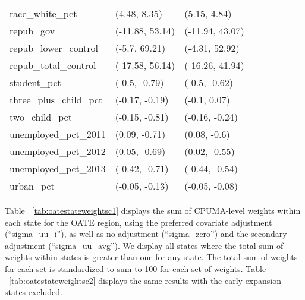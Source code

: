 \begin{table}[ht]
\begin{tabular}{lll}
  race\_white\_pct & (4.48, 8.35) & (5.15, 4.84) \\ 
  repub\_gov & (-11.88, 53.14) & (-11.94, 43.07) \\ 
  repub\_lower\_control & (-5.7, 69.21) & (-4.31, 52.92) \\ 
  repub\_total\_control & (-17.58, 56.14) & (-16.26, 41.94) \\ 
  student\_pct & (-0.5, -0.79) & (-0.5, -0.62) \\ 
  three\_plus\_child\_pct & (-0.17, -0.19) & (-0.1, 0.07) \\ 
  two\_child\_pct & (-0.15, -0.81) & (-0.16, -0.24) \\ 
  unemployed\_pct\_2011 & (0.09, -0.71) & (0.08, -0.6) \\ 
  unemployed\_pct\_2012 & (0.05, -0.69) & (0.02, -0.55) \\ 
  unemployed\_pct\_2013 & (-0.42, -0.71) & (-0.44, -0.54) \\ 
  urban\_pct & (-0.05, -0.13) & (-0.05, -0.08) \\ 
   \bottomrule
\end{tabular}
\end{table}

Table ~\ref{tab:oatestateweightsc1} displays the sum of CPUMA-level weights within each state for the OATE region, using the preferred covariate adjustment (``sigma\_uu\_i''), as well as no adjustment (``sigma\_zero'') and the secondary adjustment (``sigma\_uu\_avg''). We display all states where the total sum of weights within states is greater than one for any state. The total sum of weights for each set is standardized to sum to 100 for each set of weights. Table ~\ref{tab:oatestateweightsc2} displays the same results with the early expansion states excluded.

